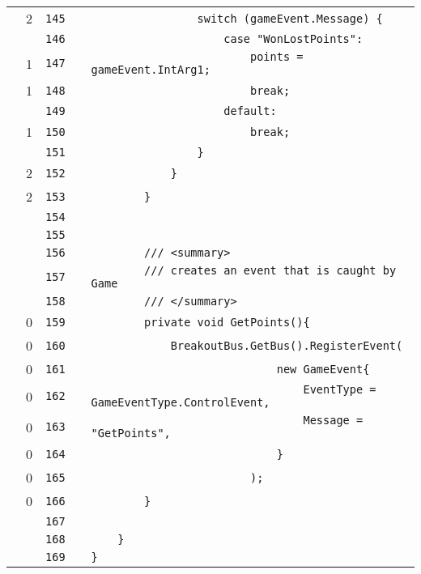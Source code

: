 \documentclass[a4paper,landscape,10pt]{article}
\begin{document}
\begin{longtable}[l]{lrrll}
\cellcolor{green} & 2 & \verb~145~ & & \verb~                switch (gameEvent.Message) {~\\
\cellcolor{gray} &  & \verb~146~ & & \verb~                    case "WonLostPoints":~\\
\cellcolor{green} & 1 & \verb~147~ & & \verb~                        points = gameEvent.IntArg1;~\\
\cellcolor{green} & 1 & \verb~148~ & & \verb~                        break;~\\
\cellcolor{gray} &  & \verb~149~ & & \verb~                    default:~\\
\cellcolor{green} & 1 & \verb~150~ & & \verb~                        break;~\\
\cellcolor{gray} &  & \verb~151~ & & \verb~                }~\\
\cellcolor{green} & 2 & \verb~152~ & & \verb~            }~\\
\cellcolor{green} & 2 & \verb~153~ & & \verb~        }~\\
\cellcolor{gray} &  & \verb~154~ & & \verb~~\\
\cellcolor{gray} &  & \verb~155~ & & \verb~~\\
\cellcolor{gray} &  & \verb~156~ & & \verb~        /// <summary>~\\
\cellcolor{gray} &  & \verb~157~ & & \verb~        /// creates an event that is caught by Game~\\
\cellcolor{gray} &  & \verb~158~ & & \verb~        /// </summary>~\\
\cellcolor{red} & 0 & \verb~159~ & & \verb~        private void GetPoints(){~\\
\cellcolor{red} & 0 & \verb~160~ & & \verb~            BreakoutBus.GetBus().RegisterEvent(~\\
\cellcolor{red} & 0 & \verb~161~ & & \verb~                            new GameEvent{~\\
\cellcolor{red} & 0 & \verb~162~ & & \verb~                                EventType = GameEventType.ControlEvent,~\\
\cellcolor{red} & 0 & \verb~163~ & & \verb~                                Message = "GetPoints",~\\
\cellcolor{red} & 0 & \verb~164~ & & \verb~                            }~\\
\cellcolor{red} & 0 & \verb~165~ & & \verb~                        );~\\
\cellcolor{red} & 0 & \verb~166~ & & \verb~        }~\\
\cellcolor{gray} &  & \verb~167~ & & \verb~~\\
\cellcolor{gray} &  & \verb~168~ & & \verb~    }~\\
\cellcolor{gray} &  & \verb~169~ & & \verb~}~\\
\end{longtable}
\newpage
\end{document}
